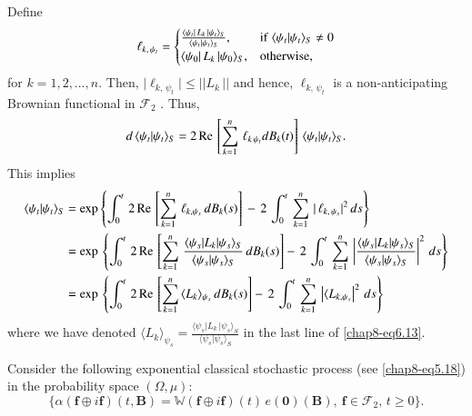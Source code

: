 Define 
\begin{eqnarray}
\ell_{k,\,\psi_t}=
		\begin{cases}
		\frac{\langle \psi_t\vert\, L_k\,\vert\psi_t\rangle_S}{\langle \psi_t\vert \psi_t\rangle_S}, &   {\rm if}\ \langle \psi_t\vert \psi_t\rangle_S\neq 0 \\
		\langle \psi_0\vert\, L_k\,\vert\psi_0\rangle_S, &  {\rm otherwise,}
		\end{cases}\label{chap8-eq6.11}
\end{eqnarray}
for $k=1,2,\ldots , n$.  Then, $\vert  \ell_{k,\,\psi_t} \vert \leq \vert\vert L_k\,\vert\vert$ and hence, $\ell_{k,\, \psi_t}$ is a non-anticipating Brownian functional in  $\mathcal{F}_2$ . Thus,    
\begin{eqnarray} 
d\, \langle \psi_t\vert \psi_t\rangle_S= 2\, {\rm Re}\, \left[\sum_{k=1}^{n}\, \ell_{k\, \psi_t} 
dB_k(t)\right]\, \langle \psi_t\vert \psi_t\rangle_S.  \label{chap8-eq6.12}
\end{eqnarray}   
This implies 
{\fontsize{8pt}{10pt}\selectfont 
\begin{align}
	\langle \psi_t\vert \psi_t\rangle_S &=\exp \left\{\int_{0}^{t}\, 2\, {\rm Re}\, \left[ \sum_{k=1}^{n}\,\ell_{k,\psi_s}\, dB_{k}(s)\right]\, -\, 2\,\int_{0}^{t}\, \sum_{k=1}^n\, \vert\,\ell_{k,\,\psi_s}\vert^2\, ds\right\}\nonumber \\ 
	&= {\exp}\,\left\{\int_{0}^{t}\, 2\, {\rm Re}\, \left[ \sum_{k=1}^n\, \frac{\langle \psi_s\vert L_k\vert\psi_s\rangle_S}{\langle \psi_s\vert \psi_s\rangle_S}\, 
	dB_k(s)\right] -\, 2\,\int_{0}^{t}\, \sum_{k=1}^n\, \left|\frac{\langle \psi_s\vert  L_k\vert \psi_s\rangle_S}{\langle \psi_s\vert \psi_s\rangle_S}\right|^2\, ds\right\}\nonumber \\  
	&=  {\exp}\,\left\{\int_{0}^{t}\,  2\,{\rm Re}\, \left[\sum_{k=1}^n\,\langle L_k\rangle_{\psi_s}\, 
	dB_k(s)\right]   -\, 2\,\int_{0}^{t}\, \sum_{k=1}^n\,\left\vert \langle L_{k,\psi_s} \right\vert^2\, ds 
	\right\} \label{chap8-eq6.13}
\end{align}}\relax
where we have denoted $\langle L_k\rangle_{\psi_s}=\frac{\langle \psi_s\vert L_{k}\,\vert\psi_s\rangle_S}
{\langle \psi_s\vert \psi_s\rangle_S}$ in the last line of \eqref{chap8-eq6.13}. 

Consider the following exponential classical stochastic process (see \eqref{chap8-eq5.18}) in the probability space $(\Omega, \mu)$:     
\begin{equation}
\{\alpha(\mathbf{f}\oplus i\mathbf{f})(t,\mathbf{B})=\mathbb{W}(\mathbf{f}\oplus i\mathbf{f})(t)\, e(\mathbf{0})(\mathbf{B}),\ \mathbf{f}\in\mathcal{F}_2,\, t\geq 0\}. \label{chap8-eq6.14}
\end{equation}

